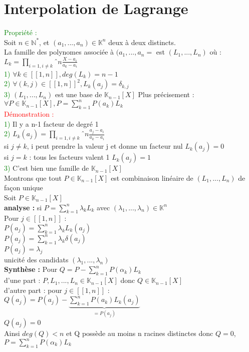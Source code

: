 \documentclass{article}
\begin{document}
\section{Interpolation de Lagrange}
\textcolor{green}{Propriété :} \\ 
Soit $n \in \mathbb N^*$, et $(a_1,...,a_n) \in \mathbb K^n$ deux à deux distincts. \\ 
La famille des polynomes associée à $(a_1,...,a_n=$ est $(L_1,...,L_n)$ où : \\ 
$L_k=\prod_{i=1,i \neq k}ˆn \frac{X-a_i}{a_k-a_i}$ \\ 
\textcolor{green}{1)} $\forall k \in [[1,n]], deg(L_k)=n-1$ \\ 
\textcolor{green}{2)} $\forall (k,j) \in [[1,n]]^2, L_k(a_j)=\delta_{k,j}$ \\ 
\textcolor{green}{3)} $(L_1,...,L_n)$ est une base de $\mathbb K_{n-1} [X] $ Plus précisement : \\ 
$\forall P \in \mathbb K_{n-1} [X], P= \sum_{k=1}^n P(a_k) L_k$ \\ 
\textcolor{red}{Démonstration :} \\ 
\textcolor{green}{1)} Il y a n-1 facteur de degré 1 \\ 
\textcolor{green}{2)} $L_k(a_j)=\prod_{i=1,i \neq k}ˆn \frac{a_j-a_i}{a_k-a_i}$ \\ 
si $j \neq k$, i peut prendre la valeur j et donne un facteur nul $L_k(a_j)=0$ \\ 
si $j=k$ : tous les facteurs valent 1 $L_k(a_j)=1$ \\ 
\textcolor{green}{3)} C'est bien une famille de $\mathbb K_{n-1} [X] $ \\ 
Montrons que tout $P \in \mathbb K_{n-1} [X]$ est combinaison linéaire de $(L_1,...,L_n)$ de façon unique \\ 
Soit $P \in \mathbb K_{n-1} [X]$ \\ 
{\bf analyse :} si $P= \sum_{k=1}^n \lambda_k L_k$ avec $(\lambda_1,...,\lambda_n) \in \mathbb K^n$ \\ 
Pour $j \in [[1,n]]$ : \\ 
$P(a_j)= \sum_{k=1}^n \lambda_k L_k(a_j) $ \\ 
$P(a_j)= \sum_{k=1}^n \lambda_k \delta(a_j) $ \\ 
$P(a_j)= \lambda_j $ \\ 
unicité des candidats $(\lambda_1,..., \lambda_n)$ \\
{\bf Synthèse :} Pour $Q=P- \sum_{k=1}^n P(\alpha_k) L_k$ \\ 
d'une part : $P,L_1,...,L_n \in \mathbb K_{n-1} [X]$ donc $Q \in \mathbb K_{n-1} [X]$ \\ 
d'autre part : pour $j \in [[1,n ]]$ : \\ 
$Q(a_j)=P(a_j)-\underbrace{\sum_{k=1}^n P(a_k) L_k(a_j)}_{=P(a_j)}$ \\ 
$Q(a_j)=0$ \\ 
Ainsi $deg(Q)<n$ et Q possède au moins n racines distinctes donc $Q=0$, $P= \sum_{k=1}^n P(\alpha_k) L_k$ \\
\end{document}
